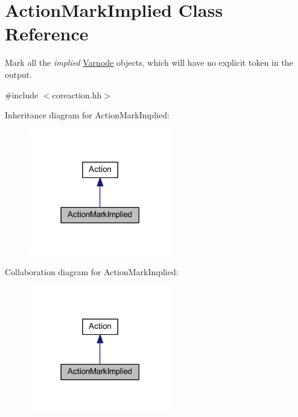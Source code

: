 \hypertarget{class_action_mark_implied}{}\section{Action\+Mark\+Implied Class Reference}
\label{class_action_mark_implied}


Mark all the {\itshape implied} \mbox{\hyperlink{class_varnode}{Varnode}} objects, which will have no explicit token in the output.  




{\ttfamily \#include $<$coreaction.\+hh$>$}



Inheritance diagram for Action\+Mark\+Implied\+:
\nopagebreak
\begin{figure}[H]
\begin{center}
\leavevmode
\includegraphics[width=177pt]{class_action_mark_implied__inherit__graph}
\end{center}
\end{figure}


Collaboration diagram for Action\+Mark\+Implied\+:
\nopagebreak
\begin{figure}[H]
\begin{center}
\leavevmode
\includegraphics[width=177pt]{class_action_mark_implied__coll__graph}
\end{center}
\end{figure}
